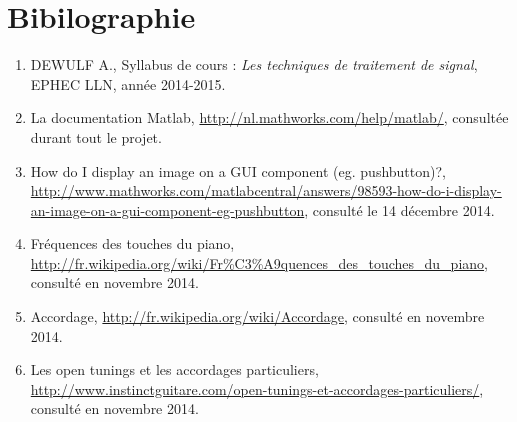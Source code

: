 \section*{Bibilographie}
\begin{enumerate}
\item DEWULF A., Syllabus de cours : \textit{Les techniques de traitement de signal}, EPHEC LLN, année 2014-2015.
\item La documentation Matlab, \url{http://nl.mathworks.com/help/matlab/}, consultée durant tout le projet.
\item How do I display an image on a GUI component (eg. pushbutton)?, \url{http://www.mathworks.com/matlabcentral/answers/98593-how-do-i-display-an-image-on-a-gui-component-eg-pushbutton}, consulté le 14 décembre 2014.
\item Fréquences des touches du piano, \url{http://fr.wikipedia.org/wiki/Fr%C3%A9quences_des_touches_du_piano}, consulté en novembre 2014.
\item Accordage, \url{http://fr.wikipedia.org/wiki/Accordage}, consulté en novembre 2014.
\item Les open tunings et les accordages particuliers, \url{http://www.instinctguitare.com/open-tunings-et-accordages-particuliers/}, consulté en novembre 2014.
\end{enumerate}